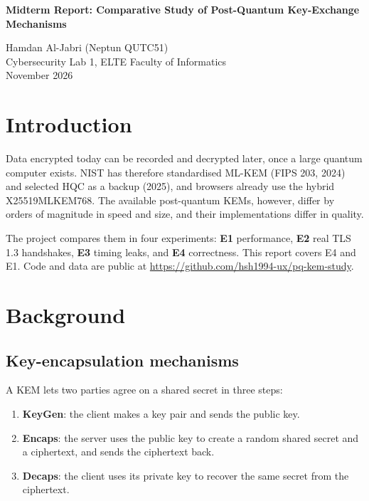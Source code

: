 \documentclass[11pt,a4paper]{article}
\begin{document}
{\raggedright\LARGE\bfseries Midterm Report: Comparative Study of Post-Quantum Key-Exchange Mechanisms\par}
\vspace{6pt}
Hamdan Al-Jabri (Neptun QUTC51)\\
Cybersecurity Lab 1, ELTE Faculty of Informatics\\
November 2026

\section{Introduction}
Data encrypted today can be recorded and decrypted later, once a large quantum computer exists. NIST has
therefore standardised ML-KEM (FIPS 203, 2024) and selected HQC as a backup (2025), and browsers already use
the hybrid X25519MLKEM768. The available post-quantum KEMs, however, differ by orders of magnitude in speed and
size, and their implementations differ in quality.

The project compares them in four experiments: \textbf{E1} performance, \textbf{E2} real TLS 1.3 handshakes,
\textbf{E3} timing leaks, and \textbf{E4} correctness. This report covers E4 and E1. Code and data are public
at \url{https://github.com/hsh1994-ux/pq-kem-study}.

\section{Background}
\subsection{Key-encapsulation mechanisms}
A KEM lets two parties agree on a shared secret in three steps:
\begin{enumerate}
  \item \textbf{KeyGen}: the client makes a key pair and sends the public key.
  \item \textbf{Encaps}: the server uses the public key to create a random shared secret and a ciphertext, and
  sends the ciphertext back.
  \item \textbf{Decaps}: the client uses its private key to recover the same secret from the ciphertext.
\end{enumerate}
\end{document}
